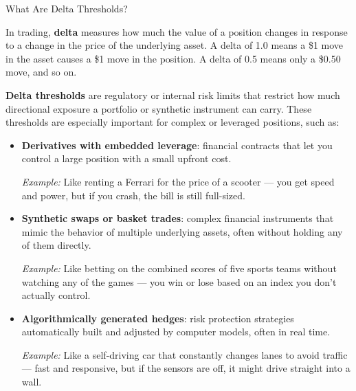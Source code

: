 \medskip

\begin{TechnicalSidebar}{What Are Delta Thresholds?}

  In trading, \textbf{delta} measures how much the value of a position changes in response to a change in the price 
  of the underlying asset.  
  A delta of 1.0 means a \$1 move in the asset causes a \$1 move in the position. A delta of 0.5 means only a \$0.50 
  move, and so on.

  \medskip

  \textbf{Delta thresholds} are regulatory or internal risk limits that restrict how much directional exposure a 
  portfolio or synthetic instrument can carry.  
  These thresholds are especially important for complex or leveraged positions, such as:

  \medskip

  \begin{itemize}
    \item \textbf{Derivatives with embedded leverage}: financial contracts that let you control a large position with a small upfront cost.  

    \medskip

    \textit{Example:} Like renting a Ferrari for the price of a scooter — you get speed and power, but if you crash, the bill is still full-sized.

    \medskip
  
    \item \textbf{Synthetic swaps or basket trades}: complex financial instruments that mimic the behavior of multiple underlying assets, often without holding any of them directly.  

    \medskip

    \textit{Example:} Like betting on the combined scores of five sports teams without watching any of the games — you win or lose based on an index you don’t actually control.

    \medskip
  
    \item \textbf{Algorithmically generated hedges}: risk protection strategies automatically built and adjusted by computer models, often in real time.  

    \medskip

    \textit{Example:} Like a self-driving car that constantly changes lanes to avoid traffic — fast and responsive, but if the sensors are off, it might drive straight into a wall.
  \end{itemize}
  


\end{TechnicalSidebar}
